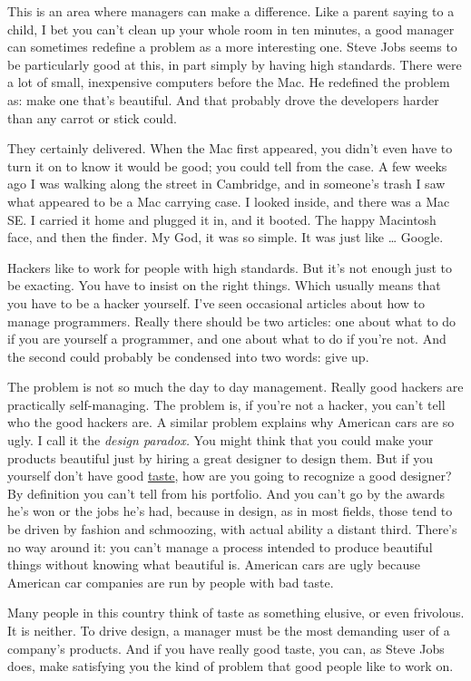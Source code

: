 This is an area where managers can make a difference. Like a parent
saying to a child, I bet you can't clean up your whole room in ten
minutes, a good manager can sometimes redefine a problem as a more
interesting one. Steve Jobs seems to be particularly good at this, in
part simply by having high standards. There were a lot of small,
inexpensive computers before the Mac. He redefined the problem as: make
one that's beautiful. And that probably drove the developers harder than
any carrot or stick could.

They certainly delivered. When the Mac first appeared, you didn't even
have to turn it on to know it would be good; you could tell from the
case. A few weeks ago I was walking along the street in Cambridge, and
in someone's trash I saw what appeared to be a Mac carrying case. I
looked inside, and there was a Mac SE. I carried it home and plugged it
in, and it booted. The happy Macintosh face, and then the finder. My
God, it was so simple. It was just like \ldots{} Google.

Hackers like to work for people with high standards. But it's not enough
just to be exacting. You have to insist on the right things. Which
usually means that you have to be a hacker yourself. I've seen
occasional articles about how to manage programmers. Really there should
be two articles: one about what to do if you are yourself a programmer,
and one about what to do if you're not. And the second could probably be
condensed into two words: give up.

The problem is not so much the day to day management. Really good
hackers are practically self-managing. The problem is, if you're not a
hacker, you can't tell who the good hackers are. A similar problem
explains why American cars are so ugly. I call it the \emph{design
paradox.} You might think that you could make your products beautiful
just by hiring a great designer to design them. But if you yourself
don't have good \href{taste.html}{taste}, how are you going to recognize
a good designer? By definition you can't tell from his portfolio. And
you can't go by the awards he's won or the jobs he's had, because in
design, as in most fields, those tend to be driven by fashion and
schmoozing, with actual ability a distant third. There's no way around
it: you can't manage a process intended to produce beautiful things
without knowing what beautiful is. American cars are ugly because
American car companies are run by people with bad taste.

Many people in this country think of taste as something elusive, or even
frivolous. It is neither. To drive design, a manager must be the most
demanding user of a company's products. And if you have really good
taste, you can, as Steve Jobs does, make satisfying you the kind of
problem that good people like to work on.


